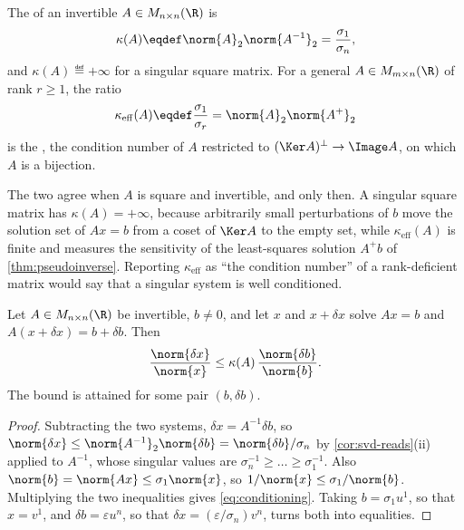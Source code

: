 \begin{definition}\label{def:condition-number}
	The  of an invertible
	$A\in M_{n\times n}(\R)$ is
	\[
		\kappa(A)\eqdef\norm{A}_2\norm{A^{-1}}_2=\frac{\sigma_1}{\sigma_n},
	\]
	and $\kappa(A)\eqdef+\infty$ for a singular square matrix. For a general
	$A\in M_{m\times n}(\R)$ of rank $r\geq1$, the ratio
	\[
		\kappa_{\mathrm{eff}}(A)\eqdef\frac{\sigma_1}{\sigma_r}
		=\norm{A}_2\norm{A^{+}}_2
	\]
	is the , the
	condition number of $A$ restricted to $(\Ker A)^{\perp}\to\Image A$, on which
	$A$ is a bijection.
\end{definition}

The two agree when $A$ is square and invertible, and only then. A singular
square matrix has $\kappa(A)=+\infty$, because arbitrarily small perturbations
of $b$ move the solution set of $Ax=b$ from a coset of $\Ker A$ to the empty
set, while $\kappa_{\mathrm{eff}}(A)$ is finite and measures the sensitivity of
the least-squares solution $A^{+}b$ of \autoref{thm:pseudoinverse}. Reporting
$\kappa_{\mathrm{eff}}$ as ``the condition number'' of a rank-deficient matrix
would say that a singular system is well conditioned.

\begin{proposition}\label{prop:conditioning}
	Let $A\in M_{n\times n}(\R)$ be invertible, $b\neq0$, and let $x$ and
	$x+\delta x$ solve $Ax=b$ and $A(x+\delta x)=b+\delta b$. Then
	\begin{equation}\label{eq:conditioning}
		\frac{\norm{\delta x}}{\norm{x}}\leq\kappa(A)\,\frac{\norm{\delta b}}{\norm{b}} .
	\end{equation}
	The bound is attained for some pair $(b,\delta b)$.
\end{proposition}

\begin{proof}
	Subtracting the two systems, $\delta x=A^{-1}\delta b$, so
	$\norm{\delta x}\leq\norm{A^{-1}}_2\norm{\delta b}=\norm{\delta b}/\sigma_n$ by
	\autoref{cor:svd-reads}(ii) applied to $A^{-1}$, whose singular values are
	$\sigma_n^{-1}\geq\dots\geq\sigma_1^{-1}$. Also
	$\norm{b}=\norm{Ax}\leq\sigma_1\norm{x}$, so
	$1/\norm{x}\leq\sigma_1/\norm{b}$. Multiplying the two inequalities gives
	\eqref{eq:conditioning}. Taking $b=\sigma_1u^1$, so that $x=v^1$, and
	$\delta b=\varepsilon u^n$, so that $\delta x=(\varepsilon/\sigma_n)v^n$,
	turns both into equalities.
\end{proof}

